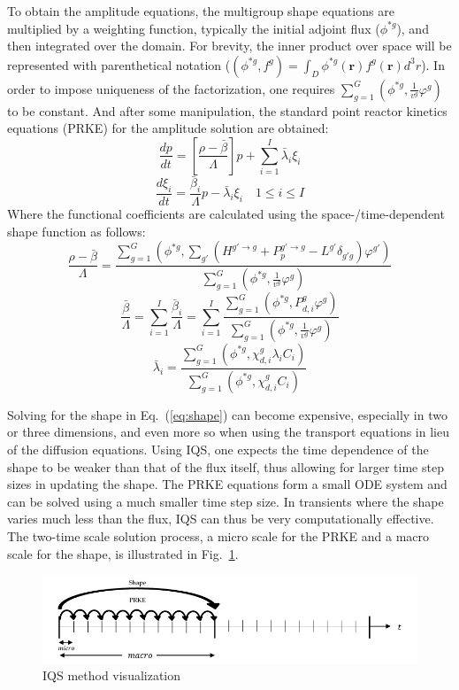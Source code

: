 \documentclass{anstrans}
\renewcommand{\vec}[1]{\bm{#1}} %
\newcommand{\eqt}[1]{Eq.~(\ref{#1})}                     %
\newcommand{\fig}[1]{Fig.~\ref{#1}}                      %
\newcommand{\be}{\begin{equation}}
\newcommand{\ee}{\end{equation}}
\begin{document}
To obtain the amplitude equations, the multigroup shape equations are multiplied by a weighting function, typically the initial adjoint flux ($\phi^{*g}$), and then integrated over the domain.  For brevity, the inner product over space will be represented with parenthetical notation ($\left(\phi^{*g},f^g\right) = \int_D \phi^{*g}(\vec{r})f^g(\vec{r})d^3r
$). In order to impose uniqueness of the factorization, one requires $\sum_{g=1}^G\left(\phi^{*g},\frac{1}{v^g}\varphi^g\right)$ to be constant.  And after some manipulation, the standard point reactor kinetics equations (PRKE) for the amplitude solution are obtained:
\be
\frac{dp}{dt}=\left[\frac{\rho-\bar{\beta}}{\Lambda}\right]p+\sum_{i=1}^I\bar{\lambda}_i\xi_i
\ee
\be
\frac{d\xi_i}{dt}=\frac{\bar{\beta}_i}{\Lambda}p-\bar{\lambda}_i\xi_i \quad 1 \le i \le I 
\ee
Where the functional coefficients are calculated using the space-/time-dependent shape function as follows:
\be
\frac{\rho-\bar{\beta}}{\Lambda}=\frac{ \sum_{g=1}^G\left(\phi^{*g},\sum_{g'}(H^{g' \to g}+P_p^{g' \to g}-L^{g'}\delta_{g'g})\varphi^{g'}\right)}{\sum_{g=1}^G\left(\phi^{*g},\frac{1}{v^g}\varphi^g\right)}
\label{eq:rmb}
\ee
\be
\frac{\bar{\beta}}{\Lambda}=\sum_{i=1}^I\frac{\bar{\beta}_i}{\Lambda}=\sum_{i=1}^I\frac{\sum_{g=1}^G(\phi^{*g}, P_{d,i}^g \varphi^g)}{\sum_{g=1}^G\left(\phi^{*g},\frac{1}{v^g}\varphi^g\right)}
\ee
\be
\bar{\lambda}_i=\frac{\sum_{g=1}^G(\phi^{*g},\chi_{d,i}^g\lambda_i C_i)}{\sum_{g=1}^G(\phi^{*g},\chi_{d,i}^gC_i)}
\label{eq:l}
\ee

Solving for the shape in \eqt{eq:shape} can become expensive, especially in two or three dimensions, and even more so when using the transport equations in lieu of the diffusion equations.  Using IQS, one expects the time dependence of the shape to be weaker than that of the flux itself,  thus allowing for larger time step sizes in updating the shape. The PRKE equations form a small ODE system and can be solved using a much smaller time step size. In transients where the shape varies much less than the flux, IQS can thus be very computationally effective. The two-time scale solution process, a micro scale for the PRKE and a macro scale for the shape, is illustrated in \fig{fig:iqsviz}.  

\begin{figure}[!htbp]
\includegraphics[width=\linewidth]{IQS_visualization.jpg}
\caption{IQS method visualization}
\label{fig:iqsviz}
\end{figure}
\end{document}
